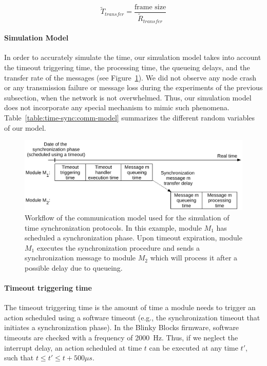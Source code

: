 \begin{equation}
\widetilde{T}_{transfer} = \frac{\text{frame size}}{\widetilde{R}_{transfer}}
\label{equation:transfer-time-model}
\end{equation}

\paragraph{Simulation Model}
\label{section:time-sync:network-simulation-model}

In order to accurately simulate the time, our simulation model takes into account the timeout triggering time, the processing time, the queueing delays, and the transfer rate of the messages (see Figure~\ref{fig:time-sync:comm-model}). We did not observe any node crash or any transmission failure or message loss during the experiments of the previous subsection, when the network is not overwhelmed. Thus, our simulation model does not incorporate any special mechanism to mimic such phenomena. Table~\ref{table:time-sync:comm-model} summarizes the different random variables of our model.

\begin{figure}[h!]
	\centering
	\includegraphics[width=0.9\linewidth]{images/time-synchronization/communication-model}
	\caption{Workflow of the communication model used for the simulation of time synchronization protocols. In this example, module $M_1$ has scheduled a synchronization phase. Upon timeout expiration, module $M_1$ executes the synchronization procedure and sends a synchronization message to module $M_2$ which will process it after a possible delay due to queueing.}
	\label{fig:time-sync:comm-model}
\end{figure}

\paragraph{Timeout triggering time}

The timeout triggering time is the amount of time a module needs to trigger an action scheduled using a software timeout (e.g., the synchronization timeout that initiates a synchronization phase). In the Blinky Blocks firmware, software timeouts are checked with a frequency of 2000~Hz. Thus, if we neglect the interrupt delay, an action scheduled at time $t$ can be executed at any time $t'$, such that $t \leq t' \leq t + 500\mu s$. 

